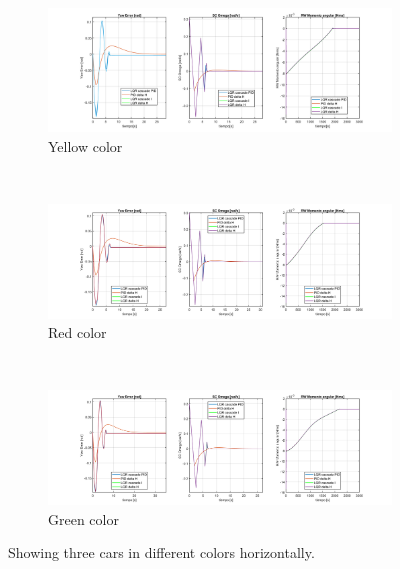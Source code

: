 \begin{figure}
	\centering
	\begin{subfigure}{1.2\linewidth}
		\includegraphics[width=\linewidth]{imagenes/resultados/Detumbling/orbit_zero/yaw_omega_h_zero.PNG}
		\caption{Yellow color}
		\label{fig:subfigA}
	\end{subfigure}\\
	\begin{subfigure}{1.2\linewidth}
		\includegraphics[width=\linewidth]{imagenes/resultados/Detumbling/orbit_iss/yaw_omega_h_iss.PNG}
		\caption{Red color}
		\label{fig:subfigB}
	\end{subfigure}\\
	\begin{subfigure}{1.2\linewidth}
		\includegraphics[width=\linewidth]{imagenes/resultados/Detumbling/orbit_polar/yaw_omega_h_polar.PNG}
		\caption{Green color}
		\label{fig:subfigC}
	\end{subfigure}
	\caption{Showing three cars in different colors horizontally.}
	\label{fig:subfigures}
\end{figure}




